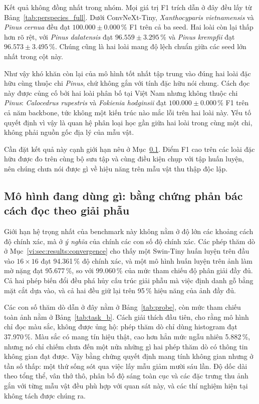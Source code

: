 Kết quả không đồng nhất trong nhóm. Mọi giá trị F1 trích dẫn ở đây đều lấy từ
Bảng~\ref{tab:perspecies_full}. Dưới ConvNeXt-Tiny,
\textit{Xanthocyparis vietnamensis} và \textit{Pinus cernua} đều đạt
$100.000 \pm 0.000$\,\% F1 trên cả ba seed. Hai loài còn lại thấp hơn rõ rệt,
với \textit{Pinus dalatensis} đạt $96.559 \pm 3.295$\,\% và
\textit{Pinus krempfii} đạt $96.573 \pm 3.495$\,\%. Chúng cũng là hai loài mang
độ lệch chuẩn giữa các seed lớn nhất trong cột này.

Như vậy khó khăn còn lại của mô hình tốt nhất tập trung vào đúng hai loài đặc
hữu cùng thuộc chi \textit{Pinus}, chứ không gắn với tính đặc hữu nói chung.
Cách đọc này được củng cố bởi hai loài phân bố tại Việt Nam nhưng không thuộc
chi \textit{Pinus}: \textit{Calocedrus rupestris} và
\textit{Fokienia hodginsii} đạt $100.000 \pm 0.000$\,\% F1 trên cả năm
backbone, tức không một kiến trúc nào mắc lỗi trên hai loài này. Yếu tố quyết
định vì vậy là quan hệ phân loại học gần giữa hai loài trong cùng một chi,
không phải nguồn gốc địa lý của mẫu vật.

Cần đặt kết quả này cạnh giới hạn nêu ở Mục~\ref{vi:sec:discussion:shortcut}.
Điểm F1 cao trên các loài đặc hữu được đo trên cùng bộ sưu tập và cùng điều
kiện chụp với tập huấn luyện, nên chúng chưa nói được gì về hiệu năng trên mẫu
vật thu thập độc lập.

\subsection{Mô hình đang dùng gì: bằng chứng phản bác cách đọc theo giải phẫu}
\label{vi:sec:discussion:shortcut}

Giới hạn hệ trọng nhất của benchmark này không nằm ở độ lớn các khoảng cách độ
chính xác, mà ở \emph{ý nghĩa} của chính các con số độ chính xác. Các phép thăm
dò ở Mục~\ref{vi:sec:results:convergence} cho thấy một Swin-Tiny huấn luyện
trên đầu vào $16\times16$ đạt 94.361\,\% độ chính xác, và một mô hình huấn
luyện trên ảnh làm mờ nặng đạt 95.677\,\%, so với 99.060\,\% của mức tham
chiếu độ phân giải đầy đủ. Cả hai phép biến đổi đều phá hủy cấu trúc giải phẫu
mà việc định danh gỗ bằng mặt cắt dựa vào, và cả hai đều giữ lại trên 95\,\%
hiệu năng của ảnh đầy đủ.

Các con số thăm dò dẫn ở đây nằm ở Bảng~\ref{tab:probe}, còn mức tham chiếu
toàn ảnh nằm ở Bảng~\ref{tab:task_b}. Cách giải thích đầu tiên, cho rằng mô
hình chỉ đọc màu sắc, không được ủng hộ: phép thăm dò chỉ dùng histogram đạt
37.970\,\%. Màu sắc có mang tín hiệu
thật, cao hơn hẳn mức ngẫu nhiên 5.882\,\%, nhưng nó chỉ chiếm chưa đến một nửa
những gì hai phép thăm dò có thông tin không gian đạt được. Vậy bằng chứng
quyết định mang tính không gian nhưng ở tần số thấp: một thứ sống sót qua việc
lấy mẫu giảm mười sáu lần. Độ dốc dài theo tổng thể, vân thớ thô, phân bố độ
sáng toàn cục và các đặc trưng thu ảnh gắn với từng mẫu vật đều phù hợp với
quan sát này, và các thí nghiệm hiện tại không tách được chúng ra.

